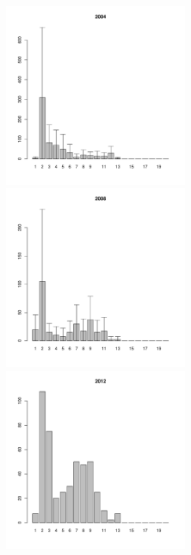 \documentclass[12pt, a4paper]{article}
\begin{document}
\begin{figure}[h]

\begin{multicols}{3}
\hfill
\includegraphics[width=60mm]{../White_Sea/Luvenga_Goreliy/high_2004_.pdf}
\hfill
\includegraphics[width=60mm]{../White_Sea/Luvenga_Goreliy/high_2008_.pdf}
\hfill
\includegraphics[width=60mm]{../White_Sea/Luvenga_Goreliy/high_2012_.pdf}
\end{multicols}




\end{figure}
\end{document}
